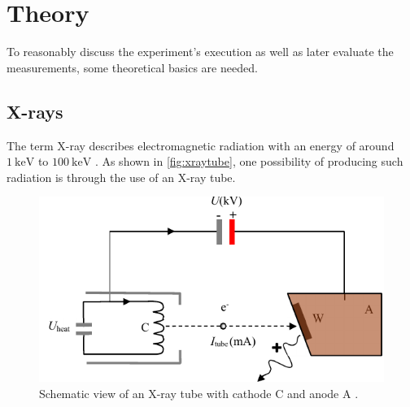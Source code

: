 \section{Theory}
\label{sec:theorie}

To reasonably discuss the experiment's execution as well as later evaluate the measurements, some theoretical basics are needed.

\subsection{X-rays}

The term X-ray describes electromagnetic radiation with an energy of around $\SI{1}{\kilo\eV}$ to $\SI{100}{\kilo\eV}$ \cite{gamma}.
As shown in \autoref{fig:xraytube}, one possibility of producing such radiation is through the use of an X-ray tube.

\begin{figure}[H]
    \centering
    \includegraphics{figures/x-ray_tube.pdf}
    \caption{Schematic view of an X-ray tube with cathode C and anode A \cite{xraytube}.}
    \label{fig:xraytube}
\end{figure}

